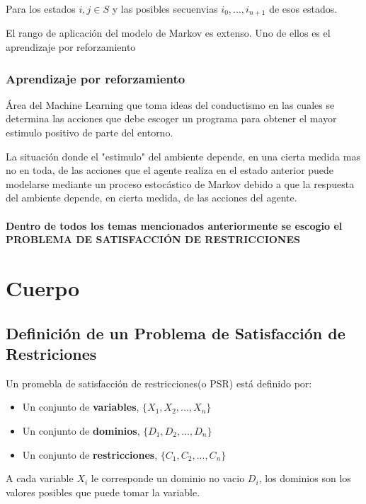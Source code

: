 \documentclass[a4paper]{article}
\begin{document}
Para los estados $i,j \in S$ y las posibles secuenvias $i_{0},..., i_{n+1}$ de esos estados.

El rango de aplicación del modelo de Markov es extenso. Uno de ellos es el aprendizaje por reforzamiento

\subsubsection*{Aprendizaje por reforzamiento}
Área del Machine Learning que toma ideas del conductismo en las cuales se determina las acciones que debe escoger un programa para obtener el mayor estimulo positivo de parte del entorno.

La situación donde el "estimulo" del ambiente depende, en una cierta medida mas no en toda, de las acciones que el agente realiza en el estado anterior puede modelarse mediante un proceso estocástico de Markov debido a que la respuesta del ambiente depende, en cierta medida, de las acciones del agente.\\\\

\textbf{
Dentro de todos los temas mencionados anteriormente se escogio el PROBLEMA DE SATISFACCIÓN DE RESTRICCIONES}
% 



\pagebreak
\section{Cuerpo}
\subsection{Definición de un  Problema de Satisfacción de Restriciones}
Un promebla de satisfacción de restricciones(o PSR) está definido por:
\begin{itemize}
	\item Un conjunto de \textbf{variables}, $\{X_1, X_2,..., X_n\}$
	\item Un conjunto de \textbf{dominios}, $\{D_1, D_2,..., D_n\}$
	\item Un conjunto de \textbf{restricciones}, $\{C_1, C_2,..., C_n\}$
\end{itemize} 
A cada variable $X_i$ le corresponde un dominio no vacio $D_i$, los dominios son los valores posibles que puede tomar la variable. 
\end{document}
